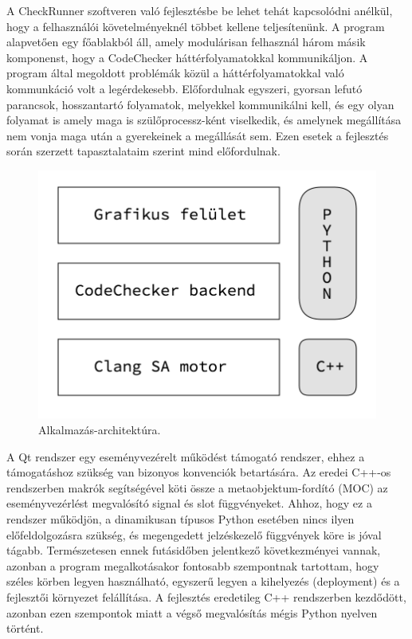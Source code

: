 \documentclass[a4paper,12pt]{report}
\begin{document}
A CheckRunner szoftveren való fejlesztésbe be lehet tehát kapcsolódni anélkül, hogy a felhasználói követelményeknél többet kellene teljesítenünk. A program alapvetően egy főablakból áll, amely modulárisan felhasznál három másik komponenst, hogy a CodeChecker háttérfolyamatokkal kommunikáljon. A program által megoldott problémák közül a háttérfolyamatokkal való kommunkáció volt a legérdekesebb. Előfordulnak egyszeri, gyorsan lefutó parancsok, hosszantartó folyamatok, melyekkel kommunikálni kell, és egy olyan folyamat is amely maga is szülőprocessz-ként viselkedik, és amelynek megállítása nem vonja maga után a gyerekeinek a megállását sem. Ezen esetek a fejlesztés során szerzett tapasztalataim szerint mind előfordulnak.

\begin{figure}[h]
\caption{Alkalmazás-architektúra.}
\centering
\includegraphics[scale=0.4]{architektura.png}
\end{figure}

A Qt rendszer egy eseményvezérelt működést támogató rendszer, ehhez a támogatáshoz szükség van bizonyos konvenciók betartására. Az eredei C++-os rendszerben makrók segítségével köti össze a metaobjektum-fordító (MOC) az eseményvezérlést megvalósító signal és slot függvényeket. Ahhoz, hogy ez a rendszer működjön, a dinamikusan típusos Python esetében nincs ilyen előfeldolgozásra szükség, és megengedett jelzéskezelő függvények köre is jóval tágabb. Természetesen ennek futásidőben jelentkező következményei vannak, azonban a  program megalkotásakor fontosabb szempontnak tartottam, hogy széles körben legyen használható, egyszerű legyen a kihelyezés (deployment) és a fejlesztői környezet felállítása. A fejlesztés eredetileg C++ rendszerben kezdődött, azonban ezen szempontok miatt a végső megvalósítás mégis Python nyelven történt.
\end{document}
